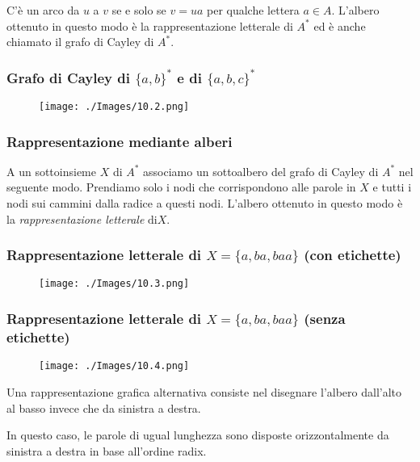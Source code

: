 C'è un arco da $u$ a $v$ se e solo se $v=u a$ per qualche lettera $a \in A$.
L'albero ottenuto in questo modo è la rappresentazione letterale di $A^{*}$ ed è anche chiamato il grafo di Cayley di $A^{*}$.

\subsubsection{Grafo di Cayley di $\{a, b\}^{*}$ e di $\{a, b, c\}^{*}$}

\begin{figure}[hbpt!]
    \centering
    \texttt{[image: ./Images/10.2.png]}
\end{figure}
\FloatBarrier

\subsubsection{Rappresentazione mediante alberi}

A un sottoinsieme $X$ di $A^{*}$ associamo un sottoalbero del grafo di Cayley di $A^{*}$ nel seguente modo.
Prendiamo solo i nodi che corrispondono alle parole in $X$ e tutti i nodi sui cammini dalla radice a questi nodi.
L'albero ottenuto in questo modo è la \textit{rappresentazione letterale} $\mathrm{di} X$.

\subsubsection{Rappresentazione letterale di $X=\{a, b a, b a a\}$ (con etichette)}

\begin{figure}[hbpt!]
    \centering
    \texttt{[image: ./Images/10.3.png]}
\end{figure}
\FloatBarrier

\subsubsection{Rappresentazione letterale di $X=\{a, b a, b a a\}$ (senza etichette)}

\begin{figure}[hbpt!]
    \centering
    \texttt{[image: ./Images/10.4.png]}
\end{figure}
\FloatBarrier

Una rappresentazione grafica alternativa consiste nel disegnare l'albero dall'alto al basso invece che da sinistra a destra.

In questo caso, le parole di ugual lunghezza sono disposte orizzontalmente da sinistra a destra in base all'ordine radix.

